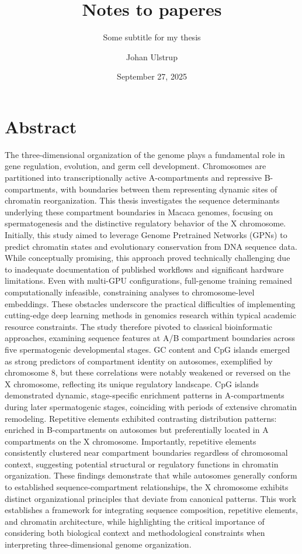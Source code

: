 \documentclass[
  a4paper,
  openany]{scrbook}
\title{Notes to paperes}
\subtitle{Some subtitle for my thesis}
\author{Johan Ulstrup}
\date{September 27, 2025}
\newenvironment{abstract}{\chapter*{Abstract}}{}
\begin{document}
\frontmatter
\maketitle
\begin{abstract}
The three-dimensional organization of the genome plays a fundamental
role in gene regulation, evolution, and germ cell development.
Chromosomes are partitioned into transcriptionally active A-compartments
and repressive B-compartments, with boundaries between them representing
dynamic sites of chromatin reorganization. This thesis investigates the
sequence determinants underlying these compartment boundaries in Macaca
genomes, focusing on spermatogenesis and the distinctive regulatory
behavior of the X chromosome. Initially, this study aimed to leverage
Genome Pretrained Networks (GPNs) to predict chromatin states and
evolutionary conservation from DNA sequence data. While conceptually
promising, this approach proved technically challenging due to
inadequate documentation of published workflows and significant hardware
limitations. Even with multi-GPU configurations, full-genome training
remained computationally infeasible, constraining analyses to
chromosome-level embeddings. These obstacles underscore the practical
difficulties of implementing cutting-edge deep learning methods in
genomics research within typical academic resource constraints. The
study therefore pivoted to classical bioinformatic approaches, examining
sequence features at A/B compartment boundaries across five
spermatogenic developmental stages. GC content and CpG islands emerged
as strong predictors of compartment identity on autosomes, exemplified
by chromosome 8, but these correlations were notably weakened or
reversed on the X chromosome, reflecting its unique regulatory
landscape. CpG islands demonstrated dynamic, stage-specific enrichment
patterns in A-compartments during later spermatogenic stages, coinciding
with periods of extensive chromatin remodeling. Repetitive elements
exhibited contrasting distribution patterns: enriched in B-compartments
on autosomes but preferentially located in A compartments on the X
chromosome. Importantly, repetitive elements consistently clustered near
compartment boundaries regardless of chromosomal context, suggesting
potential structural or regulatory functions in chromatin organization.
These findings demonstrate that while autosomes generally conform to
established sequence-compartment relationships, the X chromosome
exhibits distinct organizational principles that deviate from canonical
patterns. This work establishes a framework for integrating sequence
composition, repetitive elements, and chromatin architecture, while
highlighting the critical importance of considering both biological
context and methodological constraints when interpreting
three-dimensional genome organization.
\end{abstract}
\end{document}
